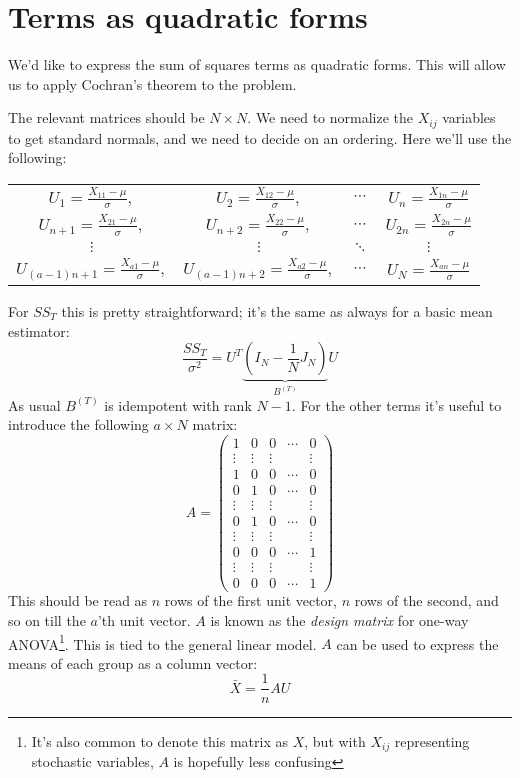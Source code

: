 \documentclass[12pt, a4paper]{article}
\begin{document}
\section{Terms as quadratic forms}
We'd like to express the sum of squares terms as quadratic forms. This will allow us to apply Cochran's theorem to the problem.\par
The relevant matrices should be $N\times N$. We need to normalize the $X_{ij}$ variables to get standard normals, and we need to decide on an ordering. Here we'll use the following:
\begin{center}
\begin{tabular}{*4{c}}
$U_1=\frac{X_{11}-\mu}{\sigma},$ & $U_2=\frac{X_{12}-\mu}{\sigma},$	& $\cdots$ & $U_n=\frac{X_{1n}-\mu}{\sigma}$ \\
$U_{n+1}=\frac{X_{21}-\mu}{\sigma},$ &	$U_{n+2}=\frac{X_{22}-\mu}{\sigma},$		& $\cdots$	& $U_{2n}=\frac{X_{2n}-\mu}{\sigma}$ \\
$\vdots$ & $\vdots$ & $\ddots$ & $\vdots$ \\
$U_{(a-1)n+1}=\frac{X_{a1}-\mu}{\sigma},$ &	$U_{(a-1)n+2}=\frac{X_{a2}-\mu}{\sigma},$		& $\cdots$	& $U_{N}=\frac{X_{an}-\mu}{\sigma}$ \\
\end{tabular}
\end{center}
For $SS_T$ this is pretty straightforward; it's the same as always for a basic mean estimator:
\begin{equation}
\frac{SS_T}{\sigma^2}=U^T\underbrace{\left(I_N-\frac{1}{N}J_N\right)}_{B^{(T)}}U
\end{equation}
As usual $B^{(T)}$ is idempotent with rank $N-1$. For the other terms it's useful to introduce the following $a\times N$ matrix:
\begin{equation}
\label{designmatrix}
A=\begin{pmatrix}
1 & 0 & 0 & \cdots & 0 \\
\vdots & \vdots & \vdots & & \vdots \\
1 & 0 & 0 & \cdots & 0 \\
0 & 1 & 0 & \cdots & 0 \\
\vdots & \vdots & \vdots & & \vdots \\
0 & 1 & 0 & \cdots & 0 \\
\vdots & \vdots & \vdots & & \vdots \\
0 & 0 & 0 & \cdots & 1 \\
\vdots & \vdots & \vdots & & \vdots \\
0 & 0 & 0 & \cdots & 1
\end{pmatrix}
\end{equation}
This should be read as $n$ rows of the first unit vector, $n$ rows of the second, and so on till the $a$'th unit vector. $A$ is known as the \textit{design matrix} for one-way ANOVA\footnote{It's also common to denote this matrix as $X$, but with $X_{ij}$ representing stochastic variables, $A$ is hopefully less confusing}. This is tied to the general linear model. $A$ can be used to express the means of each group as a column vector:
\begin{equation}
\bar{X}=\frac{1}{n}AU
\end{equation}
\end{document}
